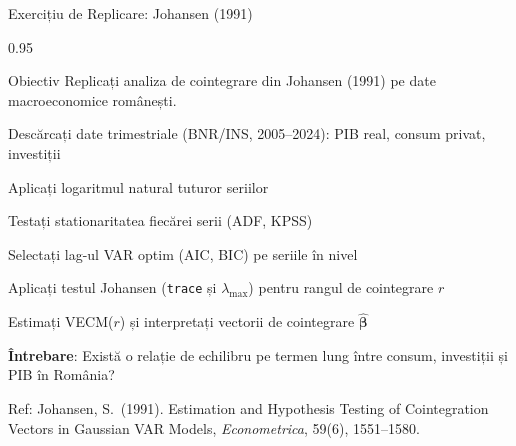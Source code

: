 \documentclass[9pt, aspectratio=169, t]{beamer}
\begin{document}
\begin{frame}{Exercițiu de Replicare: Johansen (1991)}
    \begin{cminipage}{0.95\textwidth}
        \begin{block}{Obiectiv}
            Replicați analiza de cointegrare din Johansen (1991) pe date macroeconomice românești.
        \end{block}
        \begin{enumerate}\setlength{\itemsep}{2pt}
            {\small
            \item Descărcați date trimestriale (BNR/INS, 2005--2024): PIB real, consum privat, investiții
            \item Aplicați logaritmul natural tuturor seriilor
            \item Testați stationaritatea fiecărei serii (ADF, KPSS)
            \item Selectați lag-ul VAR optim (AIC, BIC) pe seriile în nivel
            \item Aplicați testul Johansen (\texttt{trace} și $\lambda_{\max}$) pentru rangul de cointegrare $r$
            \item Estimați VECM($r$) și interpretați vectorii de cointegrare $\hat{\boldsymbol{\beta}}$
            \item \textbf{Întrebare}: Există o relație de echilibru pe termen lung între consum, investiții și PIB în România?
            }
        \end{enumerate}
        {\tiny Ref: Johansen, S.\ (1991). Estimation and Hypothesis Testing of Cointegration Vectors in Gaussian VAR Models, \textit{Econometrica}, 59(6), 1551--1580.}
    \end{cminipage}
\end{frame}
\end{document}

